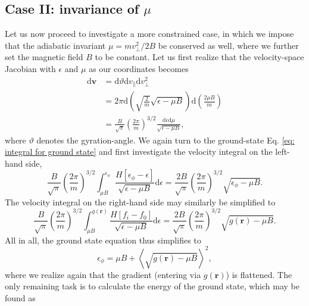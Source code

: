 \subsection*{Case II: invariance of $\mu$}
Let us now proceed to investigate a more constrained case, in which we impose that the adiabatic invariant $\mu = mv_\perp^2/2B$ be conserved as well, where we further set the magnetic field $B$ to be constant. Let us first realize that the velocity-space Jacobian with $\epsilon$ and $\mu$ as our coordinates becomes
\begin{equation}
\begin{aligned}
    \mathrm{d} \boldsymbol{v} &= \mathrm{d}  \vartheta \mathrm{d} v_\parallel \mathrm{d} v_\perp^2 \\
    &= 2\pi \mathrm{d} \left( \sqrt{\frac{2}{m}} \sqrt{\epsilon - \mu B} \right) \mathrm{d} \left( \frac{2\mu B}{m} \right) \\
    &=  \frac{B}{\sqrt{\pi}} \left(\frac{2\pi}{m}\right)^{3/2} \frac{\mathrm{d} \epsilon \mathrm{d} \mu}{\sqrt{\epsilon - \mu B}},
\end{aligned}
\end{equation}
where $\vartheta$ denotes the gyration-angle. We again turn to the ground-state Eq. \eqref{eq: integral for ground state} and first investigate the velocity integral on the left-hand side,
\begin{equation}
    \frac{B}{\sqrt{\pi}} \left(\frac{2\pi}{m}\right)^{3/2}\int_{\mu B}^{\epsilon_\phi} \frac{H \left[ \epsilon_\phi - \epsilon \right]}{\sqrt{\epsilon - \mu B}} \mathrm{d} \epsilon = \frac{2B}{\sqrt{\pi}} \left(\frac{2\pi}{m}\right)^{3/2}\sqrt{\epsilon_\phi - \mu B}.
\end{equation}
The velocity integral on the right-hand side may similarly be simplified to
\begin{equation}
    \frac{B}{\sqrt{\pi}} \left(\frac{2\pi}{m}\right)^{3/2}\int_{\mu B}^{g(\boldsymbol{r})} \frac{H \left[ f_i - f_0 \right]}{\sqrt{\epsilon - \mu B}} \mathrm{d} \epsilon = \frac{2B}{\sqrt{\pi}} \left(\frac{2\pi}{m}\right)^{3/2}\sqrt{g(\boldsymbol{r}) - \mu B}.
\end{equation}
All in all, the ground state equation thus simplifies to
\begin{equation}
    \epsilon_\phi = \mu B + \left\langle \sqrt{ g(\boldsymbol{r}) - \mu B} \right\rangle^2,
\end{equation}
where we realize again that the gradient (entering via $g(\boldsymbol{r})$) is flattened. The only remaining task is to calculate the energy of the ground state, which may be found as
